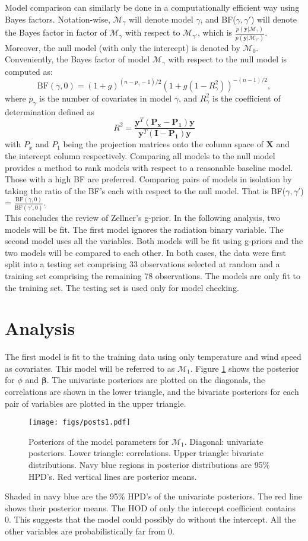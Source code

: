 \documentclass{../../tex_template/asaproc}
\newcommand{\y}{\bm y}
\newcommand{\X}{\bm X}
\newcommand{\M}{\mathcal{M}}
\begin{document}
Model comparison can similarly be done in a computationally efficient way using
Bayes factors. Notation-wise, $\M_\gamma$ will denote model $\gamma$, and
BF($\gamma,\gamma'$) will denote the Bayes factor in factor of $\M_\gamma$ with
respect to $\M_{\gamma'}$, which is
$\frac{p(\y|\M_\gamma)}{p(\y|\M_{\gamma'})}$. Moreover,
the null model (with only the intercept) is denoted by $\M_{0}$. Conveniently,
the Bayes factor of model $\M_\gamma$ with respect to the null model is
computed as: \\
\[
  \text{BF}(\gamma,0) = (1+g)^{(n-p_\gamma-1)/2} (1+g(1-R^2_\gamma))^{-(n-1)/2},
\]
where $p_\gamma$ is the number of covariates in model $\gamma$, and $R^2_\gamma$
is the coefficient of determination defined as 
\[
  R^2 = \frac{\y^T(\bm {P_x-P_1})\y}{\y^T(\bm {I-P_1})\y}
\]
with $P_x$ and $P_1$ being the projection matrices onto the column space
of $\X$ and the intercept column respectively. Comparing all models
to the null model provides a method to rank models with respect to a 
reasonable baseline model. Those with a high BF are preferred. Comparing 
pairs of models in isolation by taking the ratio of the BF's each
with respect to the null model. That is BF($\gamma,\gamma'$) = 
$\frac{\text{BF}(\gamma,0)}{\text{BF}(\gamma',0)}$.\\

This concludes the review of Zellner's g-prior. In the following 
analysis, two models will be fit. The first model ignores the radiation
binary variable. The second model uses all the variables. Both models
will be fit using g-priors and the two models will be compared to
each other. In both cases, the data were first split into a testing
set comprising 33 observations selected at random and a training 
set comprising the remaining 78 observations. The models are
only fit to the training set. The testing set is used only for
model checking.

\section{Analysis}
The first model is fit to the training data using only temperature and wind
speed as covariates. This model will be referred to as $\M_1$. Figure 
\ref{fig:posts1} shows the posterior for $\phi$ and $\bm\beta$.
The univariate posteriors are plotted on the diagonals, the correlations
are shown in the lower triangle, and the bivariate posteriors for each 
pair of variables are plotted in the upper triangle.
\begin{figure}[H]
  \texttt{[image: figs/posts1.pdf]}
  \caption{\small Posteriors of the model parameters for $\M_1$. Diagonal: univariate posteriors. 
  Lower triangle: correlations. Upper triangle: bivariate distributions. Navy blue regions
  in posterior distributions are 95\% HPD's. Red vertical lines are posterior means.}
  \label{fig:posts1}
\end{figure}
Shaded in navy blue are the 95\% HPD's of the univariate posteriors.
The red line shows their posterior means. The HOD of only the intercept
coefficient contains 0. This suggests that the model could possibly
do without the intercept. All the other variables are probabilistically
far from 0. \\
\end{document}

